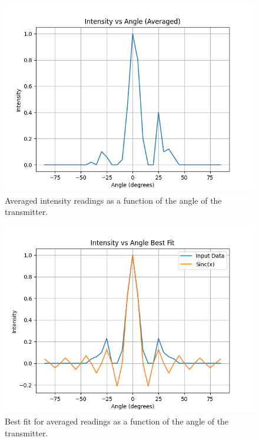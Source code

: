 \documentclass[10pt]{article}
\begin{document}
\begin{figure}
  \centering
  \includegraphics[scale=0.6]{plots/plot2.png}
  \caption{Averaged intensity readings as a function of the angle of the transmitter.}
  \label{fig:4}
\end{figure}\begin{figure}
  \centering
  \includegraphics[scale=0.6]{plots/plot3.png}
  \caption{Best fit for averaged readings as a function of the angle of the transmitter.}
  \label{fig:5}
\end{figure}
\end{document}
